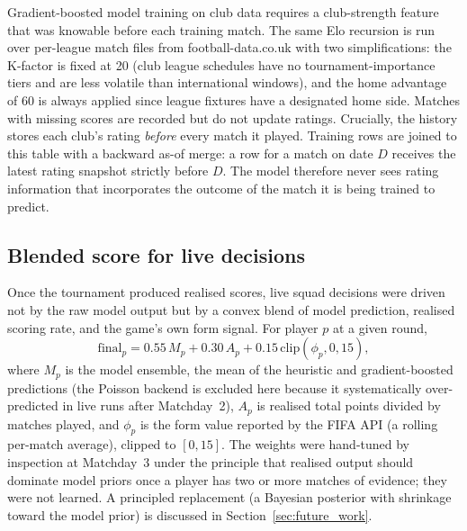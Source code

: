 Gradient-boosted model training on club data requires a club-strength
feature that was knowable before each training match. The same Elo
recursion is run over per-league match files from football-data.co.uk
with two simplifications: the K-factor is fixed at 20 (club league
schedules have no tournament-importance tiers and are less volatile
than international windows), and the home advantage of 60 is always
applied since league fixtures have a designated home side.
Matches with missing scores are recorded but do not update ratings.
Crucially, the history stores each club's rating \emph{before} every
match it played. Training rows are joined to this table with a
backward as-of merge: a row for a match on date $D$ receives the
latest rating snapshot strictly before $D$. The model therefore never
sees rating information that incorporates the outcome of the match it
is being trained to predict.

\subsection{Blended score for live decisions}
\label{sec:appendix-b-blend}

Once the tournament produced realised scores, live squad decisions
were driven not by the raw model output but by a convex blend of
model prediction, realised scoring rate, and the game's own form
signal. For player $p$ at a given round,
\begin{equation}
\mathrm{final}_p = 0.55\, M_p + 0.30\, A_p
  + 0.15\, \mathrm{clip}(\phi_p, 0, 15),
\label{eq:blend}
\end{equation}
where $M_p$ is the model ensemble, the mean of the heuristic and
gradient-boosted predictions (the Poisson backend is excluded here
because it systematically over-predicted in live runs after
Matchday~2), $A_p$ is realised total points divided by matches
played, and $\phi_p$ is the form value reported by the FIFA API (a
rolling per-match average), clipped to $[0, 15]$. The weights were
hand-tuned by inspection at Matchday~3 under the principle that
realised output should dominate model priors once a player has two or
more matches of evidence; they were not learned. A principled
replacement (a Bayesian posterior with shrinkage toward the model
prior) is discussed in Section~\ref{sec:future_work}.

